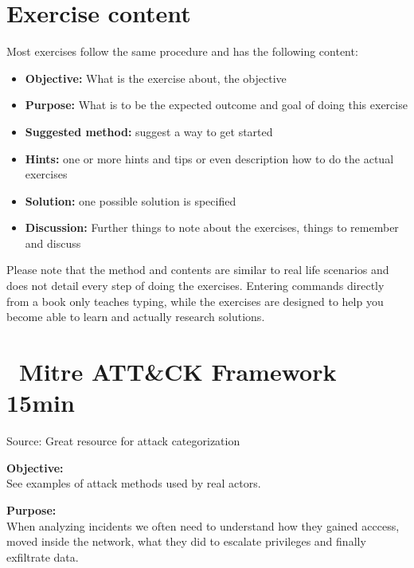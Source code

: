 \documentclass[a4paper,11pt,notitlepage]{report}
\begin{document}

\chapter*{\color{titlecolor}Exercise content}

Most exercises follow the same procedure and has the following content:
\begin{itemize}
\item {\bf Objective:} What is the exercise about, the objective
\item {\bf Purpose:} What is to be the expected outcome and goal of doing this exercise
\item {\bf Suggested method:} suggest a way to get started
\item {\bf Hints:} one or more hints and tips or even description how to
do the actual exercises
\item {\bf Solution:} one possible solution is specified
\item {\bf Discussion:} Further things to note about the exercises, things to remember and discuss
\end{itemize}

Please note that the method and contents are similar to real life scenarios and does not detail every step of doing the exercises. Entering commands directly from a book only teaches typing, while the exercises are designed to help you become able to learn and actually research solutions.




\chapter{\faInfoCircle\ Mitre ATT\&CK Framework 15min}
\label{ex:mitre-attack}



Source:  Great resource for attack categorization



{\bf Objective:}\\
See examples of attack methods used by real actors.


{\bf Purpose:}\\
When analyzing incidents we often need to understand how they gained acccess, moved inside the network, what they did to escalate privileges and finally exfiltrate data.
\end{document}
